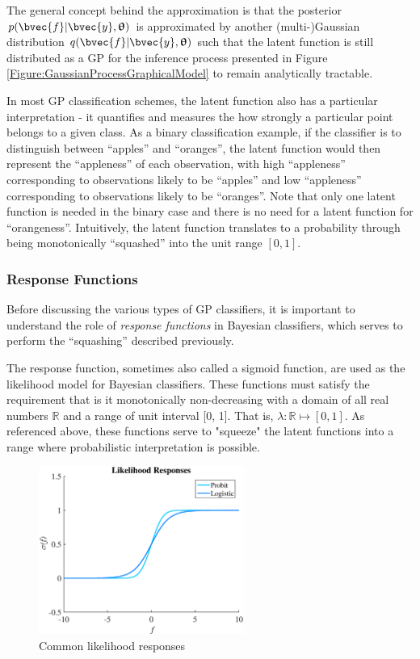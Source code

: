 			The general concept behind the approximation is that the posterior $p(\bvec{f} | \bvec{y}, \vec{\uptheta})$ is approximated by another (multi-)Gaussian distribution $q(\bvec{f} | \bvec{y}, \vec{\uptheta})$ such that the latent function is still distributed as a GP for the inference process presented in Figure \ref{Figure:GaussianProcessGraphicalModel} to remain analytically tractable.
			
			In most GP classification schemes, the latent function also has a particular interpretation - it quantifies and measures the how strongly a particular point belongs to a given class. As a binary classification example, if the classifier is to distinguish between ``apples'' and ``oranges'', the latent function would then represent the ``appleness'' of each observation, with high ``appleness'' corresponding to observations likely to be ``apples'' and low ``appleness'' corresponding to observations likely to be ``oranges''. Note that only one latent function is needed in the binary case and there is no need for a latent function for ``orangeness''. Intuitively, the latent function translates to a probability through being monotonically ``squashed'' into the unit range $[0, 1]$.
			
			\subsubsection{Response Functions}
			\label{Background:GaussianProcesses:Classification:ResponseFunction}
			
				Before discussing the various types of GP classifiers, it is important to understand the role of \textit{response functions} in Bayesian classifiers, which serves to perform the ``squashing'' described previously.
				
				The response function, sometimes also called a sigmoid function, are used as the likelihood model for Bayesian classifiers. These functions must satisfy the requirement that is it monotonically non-decreasing with a domain of all real numbers $\mathbb{R}$ and a range of unit interval [0, 1]. That is, $\lambda: \mathbb{R} \mapsto [0, 1]$. As referenced above, these functions serve to "squeeze" the latent functions into a range where probabilistic interpretation is possible.
				
				\begin{figure}[!htbp]
					\centering
						\includegraphics[width=0.6\textwidth]{Figures/responses.eps}
					\caption{Common likelihood responses}
					\label{Figure:LikelihoodResponses}
				\end{figure}
				
